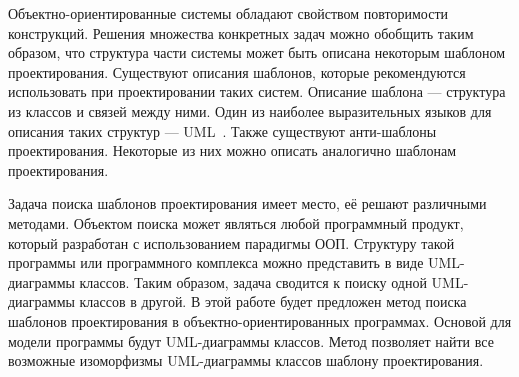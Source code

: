 \Introduction


Объектно-ориентированные системы обладают свойством повторимости конструкций.
Решения множества конкретных задач можно обобщить таким образом,
что структура части системы может быть описана некоторым шаблоном проектирования.
Существуют описания шаблонов, которые рекомендуются использовать при
проектировании таких систем.
Описание шаблона --- структура из классов и связей между ними.
Один из наиболее выразительных языков для описания таких структур ---
UML~\cite{UMLSuperstructure}.
Также существуют анти-шаблоны проектирования.
Некоторые из них можно описать аналогично шаблонам проектирования.

Задача поиска шаблонов проектирования имеет место, её решают различными методами.
Объектом поиска может являться любой программный продукт, который разработан с
использованием парадигмы ООП.
Структуру такой программы или программного комплекса можно представить в виде
UML-диаграммы классов.
Таким образом, задача сводится к поиску одной UML-диаграммы классов в другой.
В этой работе будет предложен метод поиска шаблонов проектирования в
объектно-ориентированных программах.
Основой для модели программы будут UML-диаграммы классов.
Метод позволяет найти все возможные изоморфизмы UML-диаграммы классов шаблону
проектирования.
